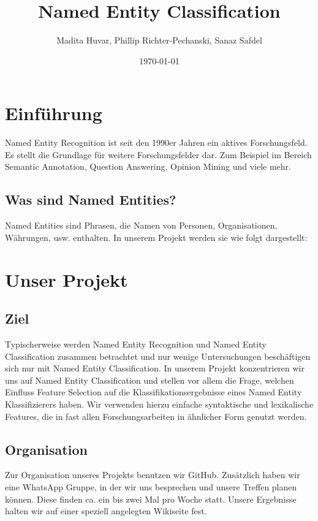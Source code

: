 \documentclass[a4paper, 11pt]{article}
\title{Named Entity Classification}
\author{Madita Huvar, Phillip Richter-Pechanski, Sanaz Safdel}
\date{\today}
\begin{document}
\maketitle
\newpage
\tableofcontents
\newpage
\section{Einführung}
Named Entity Recognition ist seit den 1990er Jahren ein aktives Forschungsfeld. Es stellt die Grundlage für weitere Forschungsfelder dar. Zum Beispiel im Bereich Semantic Annotation, Question Answering, Opinion Mining und viele mehr.
\subsection{Was sind Named Entities?}
Named Entities sind Phrasen, die Namen von Personen, Organisationen, Währungen, usw. enthalten. In unserem Projekt werden sie wie folgt dargestellt:
\section{Unser Projekt}
\subsection{Ziel}
Typischerweise werden Named Entity Recognition und Named Entity Classification zusammen betrachtet und nur wenige Untersuchungen beschäftigen sich nur mit Named Entity Classification. In unserem Projekt konzentrieren wir uns auf Named Entity Classification und stellen vor allem die Frage, welchen Einfluss Feature Selection auf die Klassifikationsergebnisse eines Named Entity Klassifizierers haben. Wir verwenden hierzu einfache syntaktische und lexikalische Features, die in fast allen Forschungsarbeiten in ähnlicher Form genutzt werden.
\subsection{Organisation}
Zur Organisation unseres Projekts benutzen wir GitHub. Zusätzlich haben wir eine WhatsApp Gruppe, in der wir uns besprechen und unsere Treffen planen können. Diese finden ca. ein bis zwei Mal pro Woche statt. Unsere Ergebnisse halten wir auf einer speziell angelegten Wikiseite fest. 
\end{document}
